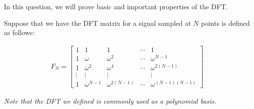 

In this question, we will prove basic and important properties of the DFT.

Suppose that we have the DFT matrix for a signal sampled at $N$ points is defined as follows:

\begin{align*}
F_N =
  \begin{bmatrix}
  1 & 1 & 1 & \cdots  & 1 \\
  1 & \omega & \omega^2 & \cdots & \omega^{N-1} \\
  1 & \omega^2 & \omega^4  & \cdots &  \omega^{2(N-1)}\\
  \vdots & \vdots & \vdots & & \vdots \\
  1 & \omega^{N-1} & \omega^{2(N-1)}  & \cdots  & \omega^{(N-1)(N-1)}
  \end{bmatrix}
\end{align*}

{\em Note that the DFT we defined is commonly used as a polynomial basis.}


